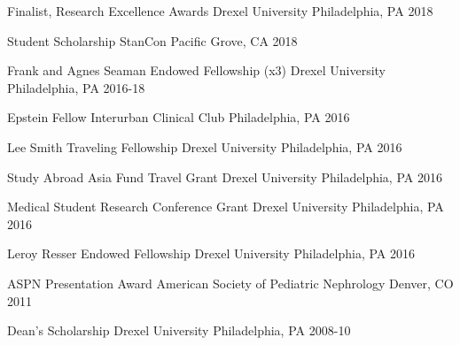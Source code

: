 



\begin{cvhonors}

  \cvhonor
    {Finalist, Research Excellence Awards} %
    {Drexel University} %
    {Philadelphia, PA} %
    {2018} %

  \cvhonor
    {Student Scholarship} %
    {StanCon} %
    {Pacific Grove, CA} %
    {2018} %

  \cvhonor
    {Frank and Agnes Seaman Endowed Fellowship (x3)} %
    {Drexel University} %
    {Philadelphia, PA} %
    {2016-18} %


  \cvhonor
    {Epstein Fellow} %
    {Interurban Clinical Club} %
    {Philadelphia, PA} %
    {2016} %
    

  \cvhonor
    {Lee Smith Traveling Fellowship} %
    {Drexel University} %
    {Philadelphia, PA} %
    {2016} %
    

  \cvhonor
    {Study Abroad Asia Fund Travel Grant} %
    {Drexel University} %
    {Philadelphia, PA} %
    {2016} %
    
  \cvhonor
    {Medical Student Research Conference Grant} %
    {Drexel University} %
    {Philadelphia, PA} %
    {2016} %
    
  \cvhonor
    {Leroy Resser Endowed Fellowship} %
    {Drexel University} %
    {Philadelphia, PA} %
    {2016} %
    
  \cvhonor
    {ASPN Presentation Award} %
    {American Society of Pediatric Nephrology} %
    {Denver, CO} %
    {2011} %

  \cvhonor
    {Dean's Scholarship} %
    {Drexel University} %
    {Philadelphia, PA} %
    {2008-10} %
\end{cvhonors}

